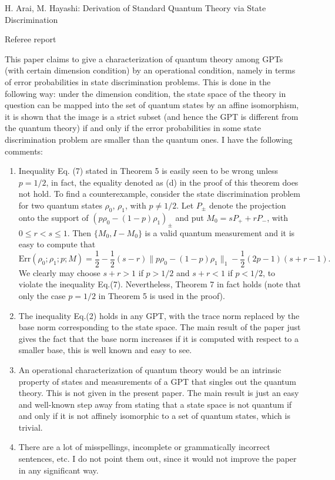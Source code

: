 \documentclass[12pt]{article}
\begin{document}
\begin{center}
{\large H. Arai, M. Hayashi:  Derivation of Standard Quantum Theory via State Discrimination
}

\end{center}
\medskip

\centerline{Referee report}

\bigskip

This paper claims to give a characterization of quantum theory among GPTs (with certain
dimension condition) by an operational condition, namely in terms of error probabilities
in state discrimination problems. This is done in the following way: under the dimension
condition, the state space of the theory in question can be mapped into the set of quantum states by
an affine isomorphism, it is shown that the image is a strict subset (and hence the GPT is
different from the quantum theory) if and only if the error probabilities in some state
discrimination problem are smaller than the quantum ones. I have the following comments:

\begin{enumerate}
\item Inequality Eq. (7) stated in Theorem 5 is easily seen to be
wrong unless $p=1/2$, in fact, the equality denoted as (d) in the proof of this theorem
does not hold. To find a counterexample, consider the state discrimination problem for two
quantum states $\rho_0$, $\rho_1$, with $p\ne 1/2$. Let $P_\pm$ denote the projection onto
the support of $(p\rho_0-(1-p)\rho_1)_\pm$ and put $M_0=sP_++rP_-$, with $0\le r<s\le 1$.
Then $\{M_0,I-M_0\}$ is a valid quantum measurement and it is easy to compute that
\[
\mathrm{Err}(\rho_0;\rho_1;p;M)=\frac12-\frac12(s-r)\|p\rho_0-(1-p)\rho_1\|_1-\frac12(2p-1)(s+r-1).
\]
We clearly may choose $s+r>1$ if $p>1/2$ and $s+r<1$ if $p<1/2$, to violate the inequality
Eq.(7).
 Nevertheless, Theorem 7 in fact holds (note that only the case $p=1/2$ in Theorem 5
is used in the proof). 

\item The inequality Eq.(2) holds in any GPT, with the trace norm replaced by the
 base norm  corresponding to the state space. The main result of the paper just gives the fact that the  base norm increases if it is computed with respect to a smaller base, this
 is well known and easy to see.

\item An operational characterization of quantum theory would be an intrinsic property of
states and measurements of a GPT that singles out the quantum theory. This is not given in
the present paper. The main result is just an easy and well-known step away from stating
that a  state space is not quantum if and only if it is not affinely isomorphic to a set
of quantum states, which is trivial.



\item There are a lot of misspellings, incomplete or grammatically incorrect sentences,
etc. I do not point them out, since it would not improve the paper in any significant way.
\end{enumerate}
\end{document}
